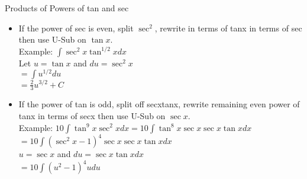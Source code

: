 \documentclass{article}
\begin{document}
\noindent
Products of Powers of tan and sec
\begin{itemize}
  \item If the power of sec is even, split $\sec^2$, rewrite in terms of tanx in terms of sec then use U-Sub on $\tan x$.\\
  Example: $\int{\sec^2x\tan^{1/2}x dx}$\\
  Let $u = \tan{x}$ and $du = \sec^2{x}$\\
  $= \int{u^{1/2}du}$\\
  $= \frac{2}{3}u^{3/2} + C$\\
  \item If the power of tan is odd, split off secxtanx, rewrite remaining even power of tanx in terms of secx then use U-Sub on $\sec{x}$.\\
  Example: $10\int{\tan^9{x}\sec^2{x}dx} = 10\int{\tan^8{x}\sec{x}\sec{x}\tan{x}dx}$\\
  $= 10\int{(\sec^2{x} - 1)^4 \sec{x}\sec{x}\tan{x} dx}$\\
  $u = \sec{x}$ and $du = \sec{x}\tan{x}dx$\\
  $= 10\int{(u^2 - 1)^4 u du}$\\
\end{itemize}
\end{document}
